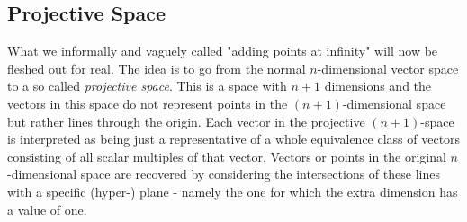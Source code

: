 \subsection{Projective Space}
What we informally and vaguely called "adding points at infinity" will now be fleshed out for real. The idea is to go from the normal $n$-dimensional vector space to a so called \emph{projective space}. This is a space with $n+1$ dimensions and the vectors in this space do not represent points in the $(n+1)$-dimensional space but rather lines through the origin. Each vector in the projective $(n+1)$-space is interpreted as being just a representative of a whole equivalence class of vectors consisting of all scalar multiples of that vector. Vectors or points in the original $n$-dimensional space are recovered by considering the intersections of these lines with a specific (hyper-) plane - namely the one for which the extra dimension has a value of one. 


